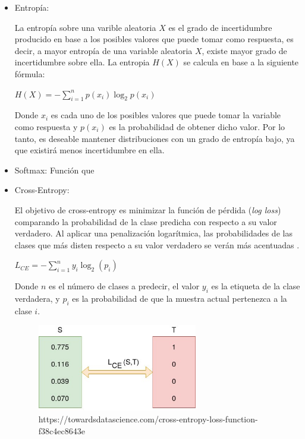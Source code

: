             \begin{itemize}

                \item Entropía:

                    La entropía sobre una varible aleatoria $X$ es el grado de incertidumbre producido en base a los posibles valores que puede tomar como respuesta, es decir, a mayor entropía de una variable aleatoria $X$, existe mayor grado de incertidumbre sobre ella. La entropia $H(X)$ se calcula en base a la siguiente fórmula:

                    \begin{center}
                        $H(X) = -\sum_{i = 1}^n p(x_i) \log_2 p(x_i)$
                    \end{center}

                    Donde $x_i$ es cada uno de los posibles valores que puede tomar la variable como respuesta y $p(x_i)$ es la probabilidad de obtener dicho valor. Por lo tanto, es deseable mantener distribuciones con un grado de entropía bajo, ya que existirá menos incertidumbre en ella.


                \item Softmax:
                    Función que 

                \item Cross-Entropy:

                    El objetivo de cross-entropy es minimizar la función de pérdida (\textit{log loss}) comparando la probabilidad de la clase predicha con respecto a su valor verdadero. Al aplicar una penalización logarítmica, las probabilidades de las clases que más disten respecto a su valor verdadero se verán más acentuadas \cite{Cross-Entropy}.

                    \begin{center}
                        $L_{CE} = -\sum_{i = 1}^n y_i \log_2(p_i)$
                    \end{center}

                    Donde $n$ es el número de clases a predecir, el valor $y_i$ es la etiqueta de la clase verdadera, y $p_i$ es la probabilidad de que la muestra actual pertenezca a la clase $i$.

                    \begin{figure}[h]
                        \centering
                        \includegraphics[width=7cm]{archivos/CNN/CrossEntropy}
                        \caption{https://towardsdatascience.com/cross-entropy-loss-function-f38c4ec8643e}
                        \label{CrossEntropyImage}
                     \end{figure}


\end{itemize}
